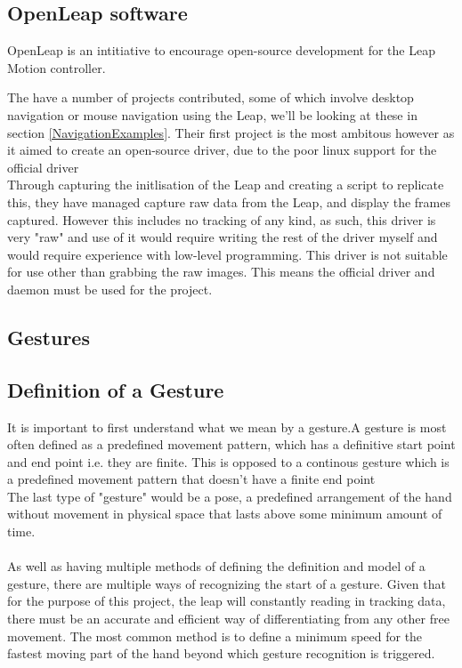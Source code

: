 \documentclass[a4paper]{article}
\begin{document}
\subsection{OpenLeap software}
OpenLeap is an intitiative to encourage open-source development for the Leap Motion controller. \cite{OpenLeapProject}\cite{OpenLeapSite}

The have a number of projects contributed, some of which involve desktop navigation or mouse navigation using the Leap, we'll be looking at these in section \ref{NavigationExamples}. Their first project is the most ambitous however as it aimed to create an open-source driver, due to the poor linux support for the official driver \cite{OpenLeapDriver} \\
Through capturing the initlisation of the Leap and creating a script to replicate this, they have managed capture raw data from the Leap, and display the frames captured. However this includes no tracking of any kind, as such, this driver is very "raw" and use of it would require writing the rest of the driver myself and would require experience with low-level programming. This driver is not suitable for use other than grabbing the raw images. This means the official driver and daemon must be used for the project.
\subsection{Gestures}
\subsection{Definition of a Gesture}
It is important to first understand what we mean by a gesture.A gesture is most often defined as a predefined movement pattern, which has a definitive start point and end point i.e. they are finite. This is opposed to a continous gesture which is a predefined movement pattern that doesn't have a finite end point \\ The last type of "gesture" would be a pose, a predefined arrangement of the hand without movement in physical space that lasts above some minimum amount of time. \\ \\
As well as having multiple methods of defining the definition and model of a gesture, there are multiple ways of recognizing the start of a gesture. Given that for the purpose of this project, the leap will constantly reading in tracking data, there must be an accurate and efficient way of differentiating from any other free movement. The most common method is to define a minimum speed for the fastest moving part of the hand beyond which gesture recognition is triggered. \\
\end{document}
